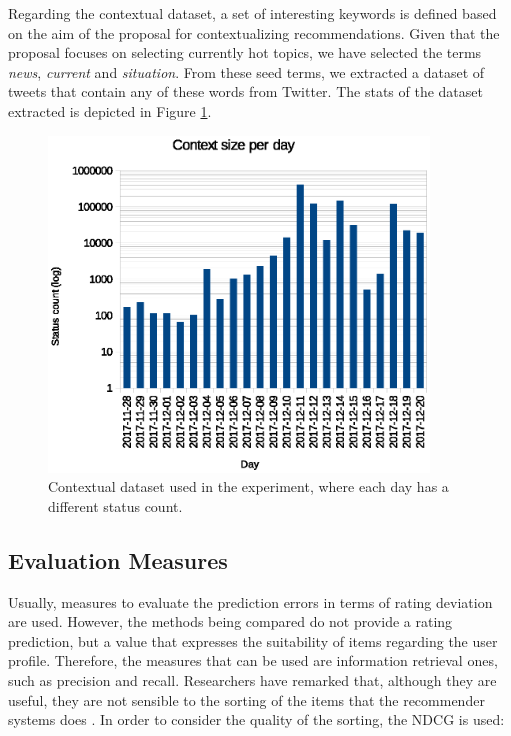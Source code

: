 \documentclass[preprint]{elsarticle}
\begin{document}
\begin{spacing}{1.5}
Regarding the contextual dataset, a set of interesting keywords is defined based on the aim of the proposal for contextualizing recommendations. Given that the proposal focuses on selecting currently hot topics, we have selected the terms \emph{news}, \emph{current} and \emph{situation}. From these seed terms, we extracted a dataset of tweets that contain any of these words from Twitter. The stats of the dataset extracted is depicted in Figure \ref{fig:context-dataset-description}.

\begin{figure}[htb]
    \centering
    \includegraphics[width=0.9\textwidth]{figures/context-dataset-description.eps}
    \caption{Contextual dataset used in the experiment, where each day has a different status count.}
    \label{fig:context-dataset-description}
\end{figure}

\subsection{Evaluation Measures}

Usually, measures to evaluate the prediction errors in terms of rating deviation are used. However, the methods being compared do not provide a rating prediction, but a value that expresses the suitability of items regarding the user profile. Therefore, the measures that can be used are information retrieval ones, such as precision and recall. Researchers have remarked that, although they are useful, they are not sensible to the sorting of the items that the recommender systems does \cite{Gunawardana2015}. In order to consider the quality of the sorting, the NDCG is used:


\end{spacing}
\end{document}
